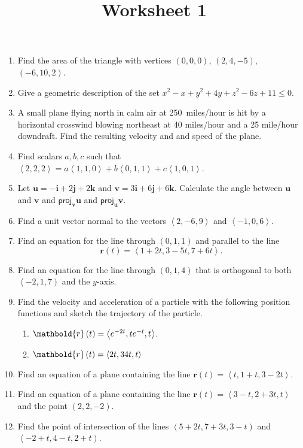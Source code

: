 \documentclass[12pt]{article}
\title{Worksheet 1}
\author{}\date{}
\let\sin\relax\DeclareMathOperator{\sin}{\mathsf{sin}}
\let\arctan\relax\DeclareMathOperator{\arctan}{\mathsf{arctan}}
\let\cos\relax\DeclareMathOperator{\cos}{\mathsf{cos}}
\begin{document}
\maketitle
\thispagestyle{empty}

\begin{enumerate}
\item Find the area of the triangle with vertices
$\left(0,0,0\right)$, $\left(2,4,-5\right)$,
$\left(-6,10,2\right)$. %

\item Give a geometric description of the set
$x^2-x+y^2+4y+z^2-6z+11\le 0$.

\item A small plane flying north in calm air at
250~miles/hour is hit by a horizontal crosswind blowing
northeast at 40 miles/hour and a 25 mile/hour downdraft.
Find the resulting velocity and and speed of the plane.
\item Find scalars $a,b,c$ such that
$\left\langle 2,2,2\right\rangle
=a\left\langle 1,1,0\right\rangle
+b\left\langle 0,1,1\right\rangle
+c\left\langle 1,0,1\right\rangle$.

\item Let $\mathbold{u}=-\mathbold{i}+2\mathbold{j}+2\mathbold{k}$
and $\mathbold{v}=3\mathbold{i}+6\mathbold{j}+6\mathbold{k}$.
Calculate the angle between $\mathbold{u}$ and $\mathbold{v}$
and $\mathsf{proj}_\mathbold{v}\mathbold{u}$
and $\mathsf{proj}_\mathbold{u}\mathbold{v}$.

\item Find a unit vector normal to the vectors
$\left\langle 2,-6,9\right\rangle$ and
$\left\langle -1,0,6\right\rangle$.
\item Find an equation for the line through
$\left(0,1,1\right)$ and parallel to the line
\[\mathbold{r}\left(t\right)=\left\langle
1+2t,3-5t,7+6t\right\rangle.\]
\item Find an equation for the line through
$\left(0,1,4\right)$ that is orthogonal to both
$\left\langle -2,1,7\right)$ and the $y$-axis.
\item Find the velocity and acceleration of
a particle with the following position
functions and sketch the trajectory
of the particle.
\begin{enumerate}
\item $\mathbold{r}\left(t\right)=\left\langle
e^{-2t},te^{-t},\arctan{t}\right\rangle$.
\item $\mathbold{r}\left(t\right)=\left\langle
\sin{2t},3\cos{4t},t\right\rangle$
\end{enumerate}
\item Find an equation of a plane containing the line
$\mathbold{r}\left(t\right)=\left\langle
t,1+t,3-2t\right\rangle$.
\item Find an equation of a plane containing the line
$\mathbold{r}\left(t\right)=\left\langle
3-t,2+3t,t\right\rangle$ and the point $\left(2,2,-2\right)$.
\item Find the point of intersection of the lines
$\left\langle 5+2t,7+3t,3-t\right)$
and $\left\langle -2+t,4-t,2+t\right)$.
\end{enumerate}
\end{document}
